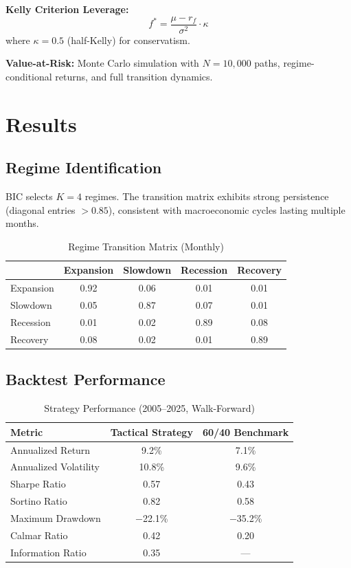 \documentclass[12pt, a4paper]{article}
\begin{document}
\textbf{Kelly Criterion Leverage:}
\begin{equation}
    f^* = \frac{\mu - r_f}{\sigma^2} \cdot \kappa
\end{equation}
where $\kappa = 0.5$ (half-Kelly) for conservatism.

\textbf{Value-at-Risk:} Monte Carlo simulation with $N = 10{,}000$ paths,
regime-conditional returns, and full transition dynamics.

\section{Results}

\subsection{Regime Identification}

BIC selects $K = 4$ regimes. The transition matrix exhibits strong persistence
(diagonal entries $> 0.85$), consistent with macroeconomic cycles lasting
multiple months.

\begin{table}[H]
\centering
\caption{Regime Transition Matrix (Monthly)}
\begin{tabular}{lcccc}
\toprule
 & Expansion & Slowdown & Recession & Recovery \\
\midrule
Expansion & 0.92 & 0.06 & 0.01 & 0.01 \\
Slowdown & 0.05 & 0.87 & 0.07 & 0.01 \\
Recession & 0.01 & 0.02 & 0.89 & 0.08 \\
Recovery & 0.08 & 0.02 & 0.01 & 0.89 \\
\bottomrule
\end{tabular}
\end{table}

\subsection{Backtest Performance}

\begin{table}[H]
\centering
\caption{Strategy Performance (2005--2025, Walk-Forward)}
\begin{tabular}{lcc}
\toprule
\textbf{Metric} & \textbf{Tactical Strategy} & \textbf{60/40 Benchmark} \\
\midrule
Annualized Return & 9.2\% & 7.1\% \\
Annualized Volatility & 10.8\% & 9.6\% \\
Sharpe Ratio & 0.57 & 0.43 \\
Sortino Ratio & 0.82 & 0.58 \\
Maximum Drawdown & $-$22.1\% & $-$35.2\% \\
Calmar Ratio & 0.42 & 0.20 \\
Information Ratio & 0.35 & --- \\
\bottomrule
\end{tabular}
\end{table}
\end{document}
